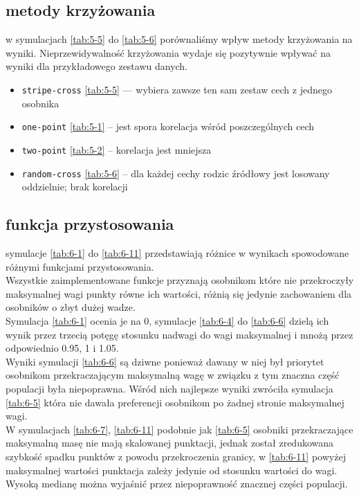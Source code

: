 \documentclass{article}
\newcommand{\cljt}[1]{\texttt{#1}}
\newcommand{\inputgraph}[1]{\newpage \newpage} %
\begin{document}
\subsection{metody krzyżowania}
w symulacjach \ref{tab:5-5} do \ref{tab:5-6} porównaliśmy wpływ metody
krzyżowania na wyniki. Nieprzewidywalność krzyżowania wydaje się pozytywnie
wpływać na wyniki dla przykładowego zestawu danych.
\begin{itemize}
	\item \cljt{stripe-cross} \ref{tab:5-5} --- wybiera zawsze ten sam zestaw cech z jednego osobnika
	\item \cljt{one-point} \ref{tab:5-1} -- jest spora korelacja wśród poszczególnych cech
	\item \cljt{two-point} \ref{tab:5-2} -- korelacja jest mniejsza
	\item \cljt{random-cross} \ref{tab:5-6} -- dla każdej cechy rodzic źródłowy jest losowany
	      oddzielnie; brak korelacji
\end{itemize}

\inputgraph{5-5.transient.tex}
\inputgraph{5-1.transient.tex}
\inputgraph{5-2.transient.tex}
\inputgraph{5-6.transient.tex}
\subsection{funkcja przystosowania}
symulacje \ref{tab:6-1} do \ref{tab:6-11} przedstawiają różnice w wynikach
spowodowane różnymi funkcjami przystosowania. \\
Wszystkie zaimplementowane funkcje przyznają osobnikom które nie przekroczyły maksymalnej wagi
punkty równe ich wartości, różnią się jedynie zachowaniem dla osobników o zbyt
dużej wadze. \\
Symulacja \ref{tab:6-1} ocenia je na 0, symulacje \ref{tab:6-4} do \ref{tab:6-6} dzielą ich wynik przez trzecią potęgę stosunku
nadwagi do wagi maksymalnej i mnożą przez odpowiednio 0.95, 1 i 1.05. \\
Wyniki symulacji \ref{tab:6-6} są dziwne ponieważ dawany w niej był priorytet
osobnikom przekraczającym maksymalną wagę w związku z tym znaczna część
populacji była niepoprawna.  Wśród nich najlepsze wyniki zwróciła symulacja
\ref{tab:6-5}
która nie dawała preferencji osobnikom po żadnej stronie maksymalnej wagi. \\
W symulacjach \ref{tab:6-7}, \ref{tab:6-11} podobnie jak
\ref{tab:6-5} osobniki przekraczające maksymalną masę nie mają skalowanej
punktacji, jednak został zredukowana szybkość spadku punktów z powodu przekroczenia
granicy, w \ref{tab:6-11} powyżej maksymalnej wartości punktacja zależy jedynie
od stosunku wartości do wagi. Wysoką medianę można wyjaśnić przez niepoprawność
znacznej części populacji. \\
\inputgraph{6-1.transient.tex}
\inputgraph{6-4.transient.tex}
\inputgraph{6-5.transient.tex}
\inputgraph{6-6.transient.tex}
\inputgraph{6-7.transient.tex}
\inputgraph{6-8.transient.tex}
\inputgraph{6-9.transient.tex}
\inputgraph{6-10.transient.tex}
\inputgraph{6-11.transient.tex}
\end{document}
